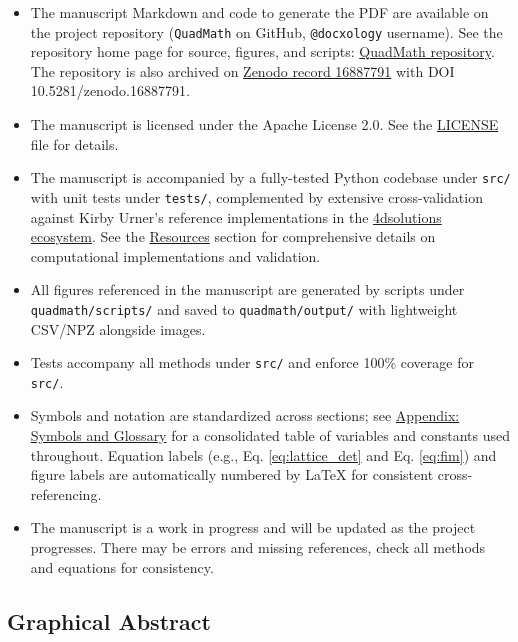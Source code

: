 \documentclass[
  10pt,
]{article}
\newcommand{\passthrough}[1]{#1}
\providecommand{\tightlist}{%
  \setlength{\itemsep}{0pt}\setlength{\parskip}{0pt}}
\begin{document}
\begin{itemize}
\tightlist
\item
  The manuscript Markdown and code to generate the PDF are available on
  the project repository (\passthrough{\lstinline!QuadMath!} on GitHub,
  \passthrough{\lstinline!@docxology!} username). See the repository
  home page for source, figures, and scripts:
  \href{https://github.com/docxology/QuadMath}{QuadMath repository}. The
  repository is also archived on
  \href{https://zenodo.org/records/16887791}{Zenodo record 16887791}
  with DOI 10.5281/zenodo.16887791.
\item
  The manuscript is licensed under the Apache License 2.0. See the
  \href{../../LICENSE}{LICENSE} file for details.
\item
  The manuscript is accompanied by a fully-tested Python codebase under
  \passthrough{\lstinline!src/!} with unit tests under
  \passthrough{\lstinline!tests/!}, complemented by extensive
  cross-validation against Kirby Urner's reference implementations in
  the \href{https://github.com/4dsolutions}{4dsolutions ecosystem}. See
  the \href{07_resources.md}{Resources} section for comprehensive
  details on computational implementations and validation.
\item
  All figures referenced in the manuscript are generated by scripts
  under \passthrough{\lstinline!quadmath/scripts/!} and saved to
  \passthrough{\lstinline!quadmath/output/!} with lightweight CSV/NPZ
  alongside images.
\item
  Tests accompany all methods under \passthrough{\lstinline!src/!} and
  enforce 100\% coverage for \passthrough{\lstinline!src/!}.
\item
  Symbols and notation are standardized across sections; see
  \href{10_symbols_glossary.md}{Appendix: Symbols and Glossary} for a
  consolidated table of variables and constants used throughout.
  Equation labels (e.g., Eq. \eqref{eq:lattice_det} and Eq.
  \eqref{eq:fim}) and figure labels are automatically numbered by LaTeX
  for consistent cross-referencing.
\item
  The manuscript is a work in progress and will be updated as the
  project progresses. There may be errors and missing references, check
  all methods and equations for consistency.
\end{itemize}

\subsection{Graphical Abstract}\label{graphical-abstract}
\end{document}
